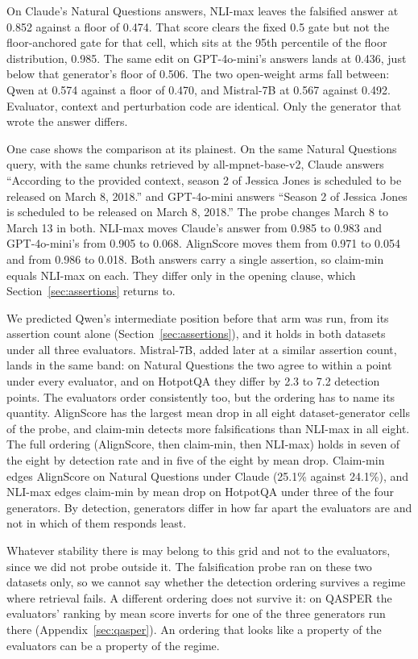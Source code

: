 \documentclass[11pt]{article}
\begin{document}
On Claude's Natural Questions answers, NLI-max leaves the falsified answer at 0.852 against a floor of 0.474. That score clears the fixed 0.5 gate but not the floor-anchored gate for that cell, which sits at the 95th percentile of the floor distribution, 0.985. The same edit on GPT-4o-mini's answers lands at 0.436, just below that generator's floor of 0.506. The two open-weight arms fall between: Qwen at 0.574 against a floor of 0.470, and Mistral-7B at 0.567 against 0.492. Evaluator, context and perturbation code are identical. Only the generator that wrote the answer differs.

One case shows the comparison at its plainest. On the same Natural Questions query, with the same chunks retrieved by all-mpnet-base-v2, Claude answers ``According to the provided context, season 2 of Jessica Jones is scheduled to be released on March 8, 2018.'' and GPT-4o-mini answers ``Season 2 of Jessica Jones is scheduled to be released on March 8, 2018.'' The probe changes March 8 to March 13 in both. NLI-max moves Claude's answer from 0.985 to 0.983 and GPT-4o-mini's from 0.905 to 0.068. AlignScore moves them from 0.971 to 0.054 and from 0.986 to 0.018. Both answers carry a single assertion, so claim-min equals NLI-max on each. They differ only in the opening clause, which Section~\ref{sec:assertions} returns to.

We predicted Qwen's intermediate position before that arm was run, from its assertion count alone (Section~\ref{sec:assertions}), and it holds in both datasets under all three evaluators. Mistral-7B, added later at a similar assertion count, lands in the same band: on Natural Questions the two agree to within a point under every evaluator, and on HotpotQA they differ by 2.3 to 7.2 detection points. The evaluators order consistently too, but the ordering has to name its quantity. AlignScore has the largest mean drop in all eight dataset-generator cells of the probe, and claim-min detects more falsifications than NLI-max in all eight. The full ordering (AlignScore, then claim-min, then NLI-max) holds in seven of the eight by detection rate and in five of the eight by mean drop. Claim-min edges AlignScore on Natural Questions under Claude (25.1\% against 24.1\%), and NLI-max edges claim-min by mean drop on HotpotQA under three of the four generators. By detection, generators differ in how far apart the evaluators are and not in which of them responds least.

Whatever stability there is may belong to this grid and not to the evaluators, since we did not probe outside it. The falsification probe ran on these two datasets only, so we cannot say whether the detection ordering survives a regime where retrieval fails. A different ordering does not survive it: on QASPER the evaluators' ranking by mean score inverts for one of the three generators run there (Appendix~\ref{sec:qasper}). An ordering that looks like a property of the evaluators can be a property of the regime.
\end{document}
